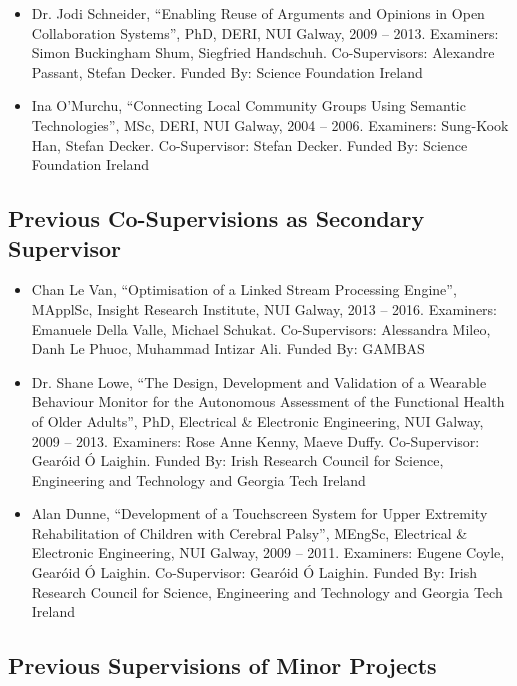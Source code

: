\documentclass[10pt,a4paper]{res} %
\begin{document}
\begin{resume}
\begin{itemize}
\item Dr. Jodi Schneider, ``Enabling Reuse of Arguments and Opinions in Open Collaboration Systems'', PhD, DERI, NUI Galway, 2009 -- 2013. Examiners: Simon Buckingham Shum, Siegfried Handschuh. Co-Supervisors: Alexandre Passant, Stefan Decker. Funded By: Science Foundation Ireland %
\item Ina O'Murchu, ``Connecting Local Community Groups Using Semantic Technologies'', MSc, DERI, NUI Galway, 2004 -- 2006. Examiners: Sung-Kook Han, Stefan Decker. Co-Supervisor: Stefan Decker. Funded By: Science Foundation Ireland
\end{itemize}

\subsection*{Previous Co-Supervisions as Secondary Supervisor}

\begin{itemize} \itemsep -2pt
\item Chan Le Van, ``Optimisation of a Linked Stream Processing Engine'', MApplSc, Insight Research Institute, NUI Galway, 2013 -- 2016. Examiners: Emanuele Della Valle, Michael Schukat. Co-Supervisors: Alessandra Mileo, Danh Le Phuoc, Muhammad Intizar Ali. Funded By: GAMBAS
\item Dr. Shane Lowe, ``The Design, Development and Validation of a Wearable Behaviour Monitor for the Autonomous Assessment of the Functional Health of Older Adults'', PhD, Electrical \& Electronic Engineering, NUI Galway, 2009 -- 2013. Examiners: Rose Anne Kenny, Maeve Duffy. Co-Supervisor: Gear\'{o}id \'{O} Laighin. Funded By: Irish Research Council for Science, Engineering and Technology and Georgia Tech Ireland
\item Alan Dunne, ``Development of a Touchscreen System for Upper Extremity Rehabilitation of Children with Cerebral Palsy'', MEngSc, Electrical \& Electronic Engineering, NUI Galway, 2009 -- 2011. Examiners: Eugene Coyle, Gear\'{o}id \'{O} Laighin. Co-Supervisor: Gear\'{o}id \'{O} Laighin. Funded By: Irish Research Council for Science, Engineering and Technology and Georgia Tech Ireland
\end{itemize}

\subsection*{Previous Supervisions of Minor Projects}


\end{resume}
\end{document}
